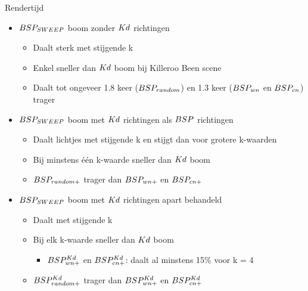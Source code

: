 \documentclass[11pt,t]{beamer}
\begin{document}
\begin{frame}{Rendertijd}
		\begin{itemize}
			\item $BSP_{SWEEP}$ boom zonder $Kd$ richtingen
			\begin{itemize}
				\item Daalt sterk met stijgende k
				\item Enkel sneller dan $Kd$ boom bij Killeroo Been scene
				\item Daalt tot ongeveer 1.8 keer ($BSP_{random}$) en 1.3 keer ($BSP_{wn}$ en $BSP_{cn}$) trager
			\end{itemize}
			\item $BSP_{SWEEP}$ boom met $Kd$ richtingen als $BSP$ richtingen
			\begin{itemize}
				\item Daalt lichtjes met stijgende k en stijgt dan voor grotere k-waarden
				\item Bij minstens één k-waarde sneller dan $Kd$ boom
				\item $BSP_{random+}$ trager dan $BSP_{wn+}$ en $BSP_{cn+}$
			\end{itemize}
			\item $BSP_{SWEEP}$ boom met $Kd$ richtingen apart behandeld
			\begin{itemize}
				\item Daalt met stijgende k
				\item Bij elk k-waarde sneller dan $Kd$ boom
					\begin{itemize}
						\item $BSP^{Kd}_{wn+}$ en $BSP^{Kd}_{cn+}$: daalt al minstens 15\% voor k = 4
					\end{itemize}
				\item $BSP^{Kd}_{random+}$ trager dan $BSP^{Kd}_{wn+}$ en $BSP^{Kd}_{cn+}$
			\end{itemize}
		\end{itemize}
\end{frame}
\end{document}
